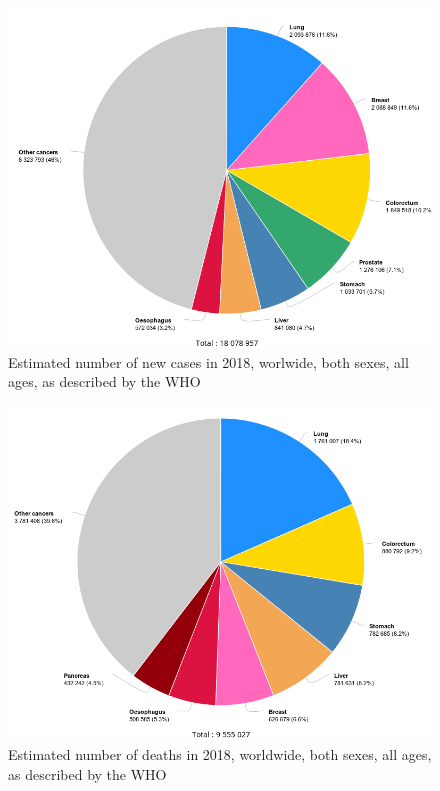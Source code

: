 \documentclass[]{article}
\begin{document}
\begin{figure}[th!]
\centering
\includegraphics[width=0.7\linewidth]{images/cancerNewCases}
\caption{Estimated number of new cases in 2018, worlwide, both sexes, all ages, as described by the WHO \cite{OMS}}
\label{fig:cancerNewCases}
\end{figure}
\begin{figure}[th!]
\centering
\includegraphics[width=0.7\linewidth]{images/cancerMortality}
\caption{Estimated number of deaths in 2018, worldwide, both sexes, all ages, as described by the WHO \cite{OMS}}
\label{fig:cancerMortality}
\end{figure}
\end{document}
